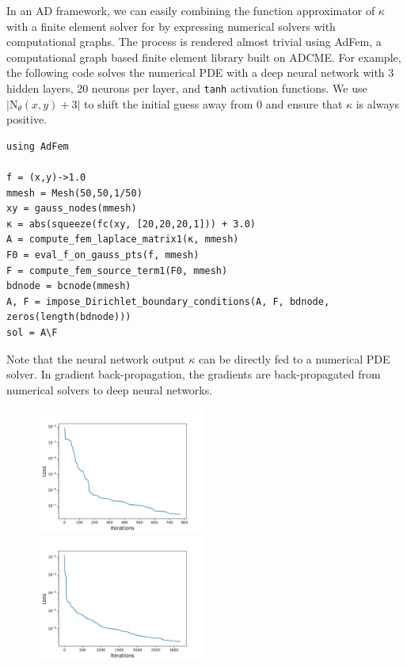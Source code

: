 \documentclass[3p,preprint,12pt]{elsarticle}
\begin{document}
In an AD framework, we can easily combining the function approximator of $\kappa$ with a finite element solver for  by expressing numerical solvers with computational graphs. The process is rendered almost trivial using AdFem, a computational graph based finite element library built on ADCME. For example, the following code solves the numerical PDE with a deep neural network with 3 hidden layers, 20 neurons per layer, and \texttt{tanh} activation functions. We use $|\text{N}_\theta(x, y) + 3|$ to shift the initial guess away from 0 and ensure that $\kappa$ is always positive. 
\begin{verbatim}
using AdFem

f = (x,y)->1.0
mmesh = Mesh(50,50,1/50)
xy = gauss_nodes(mmesh)
κ = abs(squeeze(fc(xy, [20,20,20,1])) + 3.0)
A = compute_fem_laplace_matrix1(κ, mmesh)
F0 = eval_f_on_gauss_pts(f, mmesh)
F = compute_fem_source_term1(F0, mmesh)
bdnode = bcnode(mmesh)
A, F = impose_Dirichlet_boundary_conditions(A, F, bdnode, zeros(length(bdnode)))
sol = A\F 
\end{verbatim}
Note that the neural network output $\kappa$ can be directly fed to a numerical PDE solver. In gradient back-propagation, the gradients are back-propagated from numerical solvers to deep neural networks. 

\begin{figure}[htpb]
    \centering
    \includegraphics[width=0.49\textwidth]{figures/combine_loss.png}~
    \includegraphics[width=0.49\textwidth]{figures/combine_loss_rbf.png}
    \caption{}
    \label{fig:closs_nn}
\end{figure}
\end{document}
